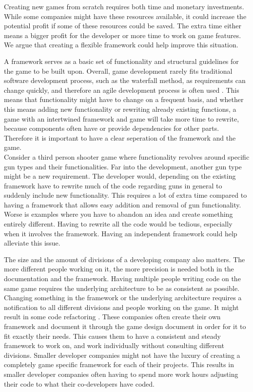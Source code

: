 Creating new games from scratch requires both time and monetary investments. While some companies might have these resources available, it could increase the potential profit if some of these resources could be saved. The extra time either means a bigger profit for the developer or more time to work on game features. We argue that creating a flexible framework could help improve this situation.

A framework serves as a basic set of functionality and structural guidelines for the game to be built upon. Overall, game development rarely fits traditional software development process, such as the waterfall method, as requirements can change quickly, and therefore an agile development process is often used \cite{Gamedevelopment}. This means that functionality might have to change on a frequent basis, and whether this means adding new functionality or rewriting already existing functions, a game with an intertwined framework and game will take more time to rewrite, because components often have or provide dependencies for other parts. Therefore it is important to have a clear seperation of the framework and the game.\\

Consider a third person shooter game where functionality revolves around specific gun types and their functionalities. Far into the development, another gun type might be a new requirement. The developer would, depending on the existing framework have to rewrite much of the code regarding guns in general to suddenly include new functionality. This requires a lot of extra time compared to having a framework that allows easy addition and removal of gun functionality. Worse is examples where you have to abandon an idea and create something entirely different. Having to rewrite all the code would be tedious, especially when it involves the framework. Having an independent framework could help alleviate this issue.

The size and the amount of divisions of a developing company also matters. The more different people working on it, the more precision is needed both in the documentation and the framework. Having multiple people writing code on the same game requires the underlying architecture to be as consistent as possible. Changing something in the framework or the underlying architecture requires a notification to all different divisions and people working on the game. It might result in some code refactoring \cite{Gameprod}. These companies often create their own framework and document it through the game design document \cite{Gamedesign} in order for it to fit exactly their needs. This causes them to have a consistent and steady framework to work on, and work individually without consulting different divisions. Smaller developer companies might not have the luxury of creating a completely game specific framework for each of their projects. This results in smaller developer companies often having to spend more work hours adjusting their code to what their co-developers have coded.

